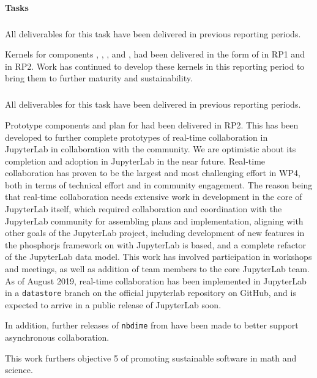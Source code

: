 \paragraph{Tasks}

\subparagraph{}
\label{UI@ipython-kernels}

All deliverables for this task have been delivered in previous reporting periods.

Kernels for \ODK components \GAP, \Pari, \Sage, and \Singular,
had been delivered in the form of 
in RP1 and  in RP2.
Work has continued to develop these kernels in this reporting period
to bring them to further maturity and sustainability.

\smallskip
\subparagraph{}
\label{UI@notebook-collab}

All deliverables for this task have been delivered in previous reporting periods.

Prototype components and plan for  had been delivered in RP2.
This has been developed to further complete prototypes of real-time collaboration in JupyterLab in collaboration with the \Jupyter community.
We are optimistic about its completion and adoption in JupyterLab in the near future.
Real-time collaboration has proven to be the largest and most challenging
effort in WP4,
both in terms of technical effort and in community engagement.
The reason being that real-time collaboration needs extensive work
in development in the core of JupyterLab itself,
which required collaboration and coordination with the JupyterLab community for assembling plans and implementation,
aligning with other goals of the JupyterLab project,
including development of new features in the phosphorjs framework on with JupyterLab is based,
and a complete refactor of the JupyterLab data model.
This work has involved participation in workshops and meetings,
as well as addition of \ODK team members to the core JupyterLab team.
As of August 2019, real-time collaboration has been implemented in JupyterLab in a \texttt{datastore} branch on the official jupyterlab repository on GitHub,
and is expected to arrive in a public release of JupyterLab soon.

In addition, further releases of \texttt{nbdime} from
 have been made
to better support asynchronous collaboration.

This work furthers \ODK objective 5 of promoting sustainable software in math and science.


